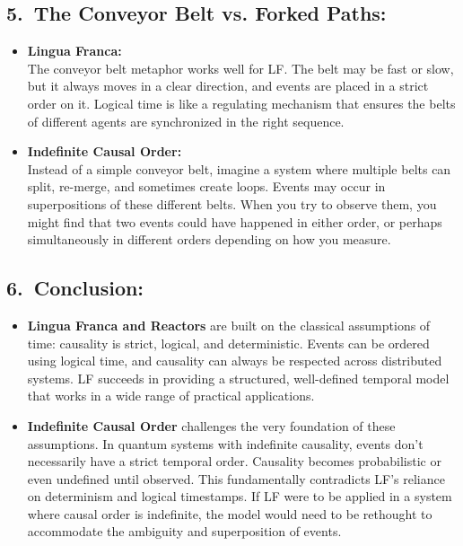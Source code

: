\subsection*{5.\ The Conveyor Belt vs. Forked Paths:}

\begin{itemize}[leftmargin=1.5em]
\item \textbf{Lingua Franca:}\\
  The conveyor belt metaphor works well for LF. The belt may be fast or slow, but it always moves in a clear direction, and events are placed in a strict order on it. Logical time is like a regulating mechanism that ensures the belts of different agents are synchronized in the right sequence.

\item \textbf{Indefinite Causal Order:}\\
  Instead of a simple conveyor belt, imagine a system where multiple belts can split, re-merge, and sometimes create loops. Events may occur in superpositions of these different belts. When you try to observe them, you might find that two events could have happened in either order, or perhaps simultaneously in different orders depending on how you measure.
\end{itemize}

\subsection*{6.\ Conclusion:}

\begin{itemize}[leftmargin=1.5em]
\item \textbf{Lingua Franca and Reactors} are built on the classical assumptions of time: causality is strict, logical, and deterministic. Events can be ordered using logical time, and causality can always be respected across distributed systems. LF succeeds in providing a structured, well-defined temporal model that works in a wide range of practical applications.
\item \textbf{Indefinite Causal Order} challenges the very foundation of these assumptions. In quantum systems with indefinite causality, events don’t necessarily have a strict temporal order. Causality becomes probabilistic or even undefined until observed. This fundamentally contradicts LF's reliance on determinism and logical timestamps. If LF were to be applied in a system where causal order is indefinite, the model would need to be rethought to accommodate the ambiguity and superposition of events.
\end{itemize}

